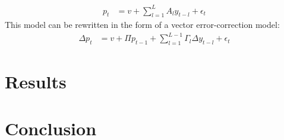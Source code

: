 \documentclass[12pt,twoside]{article}
\begin{document}
\begin{align*}
	p_t &= v + \sum_{l=1}^L A_l y_{t-l} + \epsilon_t
\end{align*}
This model can be rewritten in the form of a vector error-correction model:
\begin{align*}
	\Delta p_t &= v + \Pi p_{t-1} + \sum_{l=1}^{L-1} \Gamma_l \Delta y_{t-l}  + \epsilon_t
\end{align*}

\section{Results}

\section{Conclusion}

\newpage
	

 
\end{document}
